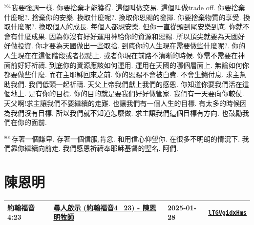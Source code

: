 \documentclass{book}
\begin{document}
$^{761}$我要強調一樣.
你要捨棄才能獲得.
這個叫做交易.
這個叫做trade off.
你要捨棄什麼呢?.
捨棄你的安樂.
換取什麼呢?.
換取你恩賜的發揮.
你要捨棄物質的享受.
換取什麼呢?.
換取個人的成長.
每個人都想安樂.
但你一直從頭到尾安樂到底.
你就不會有什麼成果.
因為你沒有好好運用神給你的資源和恩賜.
所以頂尖就要為天國好好做投資.
你才要為天國做出一些取捨.
到底你的人生現在需要做些什麼呢?.
你的人生現在在這個階段或者拐點上.
或者你現在前路不清晰的時候.
你需不需要在神面前好好祈禱.
到底你的資源應該如何運用.
運用在天國的哪個層面上.
無論如何你都要做些什麼.
而在主耶穌回來之前.
你的恩賜不會被白費.
不會生鏽付息.
求主幫助我們.
我們低頭一起祈禱.
天父上帝我們獻上我們的感恩.
你知道你要我們活在這個地上.
是有你的目標.
你的目的就是要我們好好做管家.
我們有一天要向你較仗.
天父啊!求主讓我們不要繼續的走難.
也讓我們有一個人生的目標.
有太多的時候因為我們沒有目標.
所以我們就不知道怎麼做.
求主讓我們這個目標有方向.
也鼓勵我們在你的面前.

$^{801}$存著一個謙卑.
存著一個信服,肯忿.
和用信心仰望你.
在很多不明朗的情況下.
我們靠你繼續向前走.
我們感恩祈禱奉耶穌基督的聖名.
阿們.
\newpage



\chapter{陳恩明}\label{ch:preacher14}
\begin{multicols}{3}
\minitoc
\end{multicols}
{ \scriptsize


\begin{xltabular}{\textwidth}{|p{0.15\textwidth} p{0.6\textwidth}|p{0.07\textwidth} p{0.1\textwidth}|}
\hline
約翰福音 4:23 & \hyperref[sec:lTGVgidxHms]{尋人啟示 (約翰福音4\_23) - 陳恩明牧師} & 2025-01-28 & \href{https://youtube.com/watch?v=lTGVgidxHms}{\texttt{lTGVgidxHms}} \\
\hline
\end{xltabular}
}
\newpage
\end{document}
